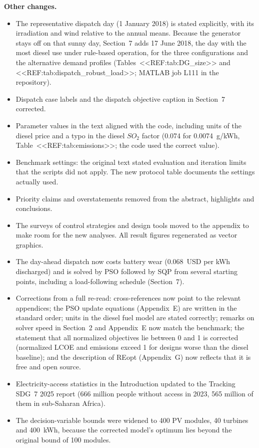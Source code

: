 \documentclass[11pt]{article}
\newcounter{rc}
\begin{document}
\textbf{Other changes.}
\begin{itemize}[leftmargin=*,itemsep=1pt]
\item The representative dispatch day (1 January 2018) is stated explicitly, with its irradiation and wind relative to the annual means. Because the generator stays off on that sunny day, Section~7 adds 17 June 2018, the day with the most diesel use under rule-based operation, for the three configurations and the alternative demand profiles (Tables~<<REF:tab:DG_size>> and <<REF:tab:dispatch_robust_load>>; MATLAB job L111 in the repository).
\item Dispatch case labels and the dispatch objective caption in Section~7 corrected.
\item Parameter values in the text aligned with the code, including units of the diesel price and a typo in the diesel $SO_2$ factor (0.074 for 0.0074~g/kWh, Table~<<REF:tab:emissions>>; the code used the correct value).
\item Benchmark settings: the original text stated evaluation and iteration limits that the scripts did not apply. The new protocol table documents the settings actually used.
\item Priority claims and overstatements removed from the abstract, highlights and conclusions.
\item The surveys of control strategies and design tools moved to the appendix to make room for the new analyses. All result figures regenerated as vector graphics.
\item The day-ahead dispatch now costs battery wear (0.068~USD per kWh discharged) and is solved by PSO followed by SQP from several starting points, including a load-following schedule (Section~7).
\item Corrections from a full re-read: cross-references now point to the relevant appendices; the PSO update equations (Appendix~E) are written in the standard order; units in the diesel fuel model are stated correctly; remarks on solver speed in Section~2 and Appendix~E now match the benchmark; the statement that all normalized objectives lie between 0 and 1 is corrected (normalized LCOE and emissions exceed 1 for designs worse than the diesel baseline); and the description of REopt (Appendix~G) now reflects that it is free and open source.
\item Electricity-access statistics in the Introduction updated to the Tracking SDG~7 2025 report (666 million people without access in 2023, 565 million of them in sub-Saharan Africa).
\item The decision-variable bounds were widened to 400 PV modules, 40 turbines and 400~kWh, because the corrected model's optimum lies beyond the original bound of 100 modules.

\end{itemize}
\end{document}
